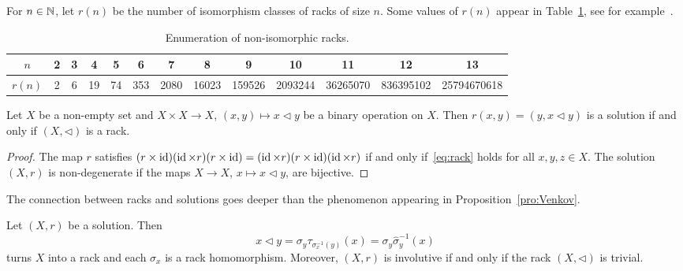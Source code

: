 For $n\in\mathbb{N}$, let $r(n)$ be the number of isomorphism classes of racks of size
$n$. Some values of $r(n)$ appear in Table~\ref{tab:racks}, see for example~\cite{MR3957904}.  

\begin{table}[H]
\centering
\caption{Enumeration of non-isomorphic racks.}
\begin{tabular}{|c|cccccccccccc|}
\hline
$n$ & 2 & 3 & 4 & 5 & 6 & 7 & 8 & 9 & 10 & 11 & 12 & 13\tabularnewline
\hline
$r(n)$ & 2 & 6 & 19 &74&353 & 2080 & 16023 & 159526 & 2093244 & 36265070 & 836395102 & 25794670618\tabularnewline
\hline
\end{tabular}
\label{tab:racks}
\end{table}

\begin{proposition}
\label{pro:Venkov}
Let $X$ be a non-empty set and $X\times X\to X$, $(x,y)\mapsto x\triangleleft y$ be a binary operation on $X$. Then
$r(x,y)=(y,x\triangleleft y)$ is a solution if and only if $(X,\triangleleft)$ is a rack. 
\end{proposition}

\begin{proof}
The map $r$ satisfies $(r\times\operatorname{id})(\operatorname{id}\times r)(r\times\operatorname{id})=(\operatorname{id}\times r)(r\times\operatorname{id})(\operatorname{id}\times r)$ if and only
if~\eqref{eq:rack} holds for all $x,y,z\in X$. The solution $(X,r)$ is non-degenerate if 
the maps $X\to X$, $x\mapsto x\triangleleft y$, are bijective. 
\end{proof}

The connection between racks and solutions goes deeper than 
the phenomenon appearing in Proposition~\ref{pro:Venkov}. 


\begin{proposition}
    \label{pro:derived}
    Let $(X,r)$ be a solution. Then 
    \begin{equation}
    \label{eq:derived}
    x\triangleleft y=\sigma_y\tau_{\sigma_x^{-1}(y)}(x)=\sigma_y\widehat{\sigma}^{-1}_y(x)
    \end{equation}
    turns $X$ into a rack and each $\sigma_x$ is a rack homomorphism. 
    Moreover, $(X,r)$ is involutive if and only if the rack $(X,\triangleleft)$ is trivial. 
\end{proposition}

